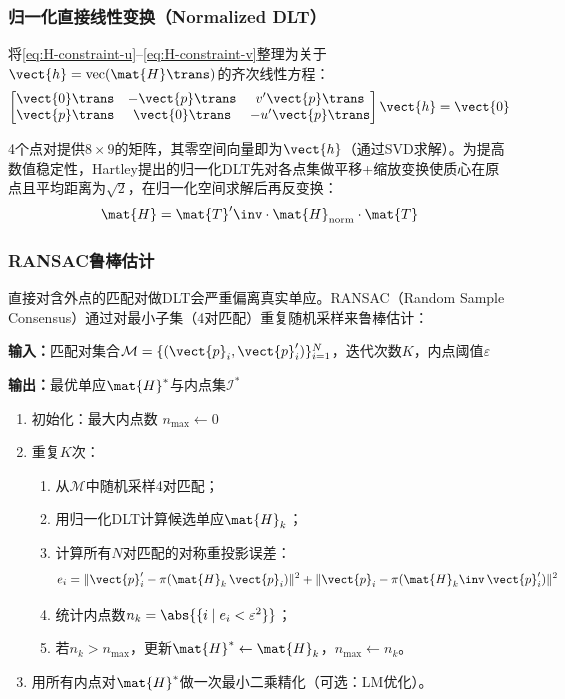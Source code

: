\subsubsection{归一化直接线性变换（Normalized DLT）}

将\eqref{eq:H-constraint-u}--\eqref{eq:H-constraint-v}整理为关于$\vect{h} = \text{vec}(\mat{H}\trans)$的齐次线性方程：
\begin{equation}
\begin{bmatrix}
\vect{0}\trans & -\vect{p}\trans & v'\vect{p}\trans \\
\vect{p}\trans & \vect{0}\trans & -u'\vect{p}\trans
\end{bmatrix}
\vect{h} = \vect{0}
\label{eq:dlt-system}
\end{equation}

4个点对提供$8\times 9$的矩阵，其零空间向量即为$\vect{h}$（通过SVD求解）。为提高数值稳定性，Hartley提出的归一化DLT先对各点集做平移+缩放变换使质心在原点且平均距离为$\sqrt{2}$，在归一化空间求解后再反变换：
\begin{equation}
\mat{H} = {\mat{T}'}\inv \cdot \mat{H}_{\text{norm}} \cdot \mat{T}
\label{eq:normalized-dlt}
\end{equation}

\subsubsection{RANSAC鲁棒估计}

直接对含外点的匹配对做DLT会严重偏离真实单应。RANSAC（Random Sample Consensus）通过对最小子集（4对匹配）重复随机采样来鲁棒估计：

\begin{resultbox}[RANSAC单应估计算法]
\textbf{输入：}匹配对集合$\mathcal{M} = \{(\vect{p}_i, \vect{p}_i')\}_{i=1}^{N}$，迭代次数$K$，内点阈值$\varepsilon$

\textbf{输出：}最优单应$\mat{H}^*$与内点集$\mathcal{I}^*$

\begin{enumerate}[leftmargin=*]
  \item 初始化：最大内点数 $n_{\max} \gets 0$
  \item 重复$K$次：
  \begin{enumerate}
    \item 从$\mathcal{M}$中随机采样4对匹配；
    \item 用归一化DLT计算候选单应$\mat{H}_k$；
    \item 计算所有$N$对匹配的对称重投影误差：
    \[
    e_i = \|\vect{p}_i' - \pi(\mat{H}_k\,\vect{p}_i)\|^2
        + \|\vect{p}_i - \pi(\mat{H}_k\inv\,\vect{p}_i')\|^2
    \]
    \item 统计内点数$n_k = \abs{\{i \mid e_i < \varepsilon^2\}}$；
    \item 若$n_k > n_{\max}$，更新$\mat{H}^* \gets \mat{H}_k$，$n_{\max} \gets n_k$。
  \end{enumerate}
  \item 用所有内点对$\mat{H}^*$做一次最小二乘精化（可选：LM优化）。
\end{enumerate}
\end{resultbox}

